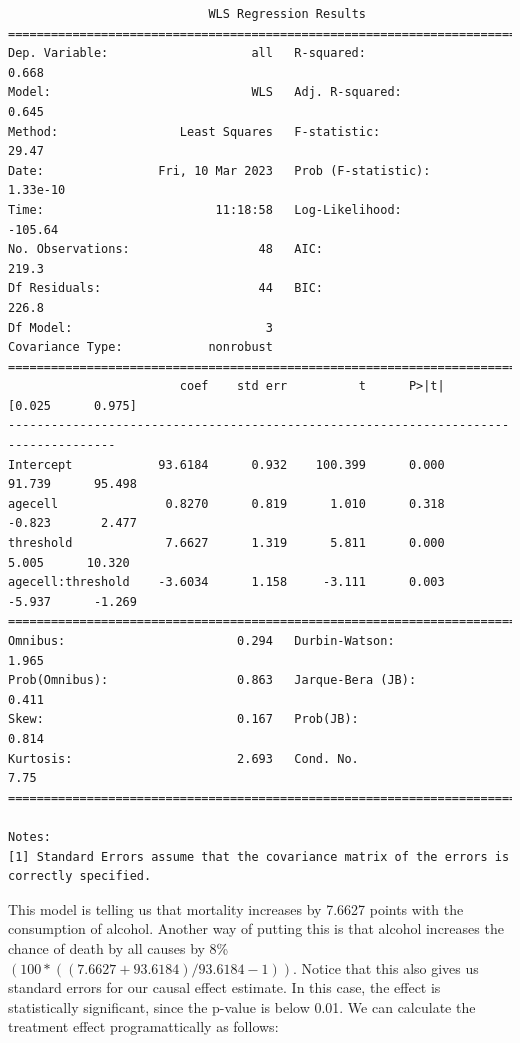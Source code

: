 \documentclass[
  letterpaper,
  DIV=11,
  numbers=noendperiod]{scrreprt}
\begin{document}
\begin{verbatim}
                            WLS Regression Results                            
==============================================================================
Dep. Variable:                    all   R-squared:                       0.668
Model:                            WLS   Adj. R-squared:                  0.645
Method:                 Least Squares   F-statistic:                     29.47
Date:                Fri, 10 Mar 2023   Prob (F-statistic):           1.33e-10
Time:                        11:18:58   Log-Likelihood:                -105.64
No. Observations:                  48   AIC:                             219.3
Df Residuals:                      44   BIC:                             226.8
Df Model:                           3                                         
Covariance Type:            nonrobust                                         
=====================================================================================
                        coef    std err          t      P>|t|      [0.025      0.975]
-------------------------------------------------------------------------------------
Intercept            93.6184      0.932    100.399      0.000      91.739      95.498
agecell               0.8270      0.819      1.010      0.318      -0.823       2.477
threshold             7.6627      1.319      5.811      0.000       5.005      10.320
agecell:threshold    -3.6034      1.158     -3.111      0.003      -5.937      -1.269
==============================================================================
Omnibus:                        0.294   Durbin-Watson:                   1.965
Prob(Omnibus):                  0.863   Jarque-Bera (JB):                0.411
Skew:                           0.167   Prob(JB):                        0.814
Kurtosis:                       2.693   Cond. No.                         7.75
==============================================================================

Notes:
[1] Standard Errors assume that the covariance matrix of the errors is correctly specified.
\end{verbatim}

This model is telling us that mortality increases by 7.6627 points with
the consumption of alcohol. Another way of putting this is that alcohol
increases the chance of death by all causes by 8\%
\((100*((7.6627+93.6184)/93.6184 - 1))\). Notice that this also gives us
standard errors for our causal effect estimate. In this case, the effect
is statistically significant, since the p-value is below 0.01. We can
calculate the treatment effect programattically as follows:
\end{document}

